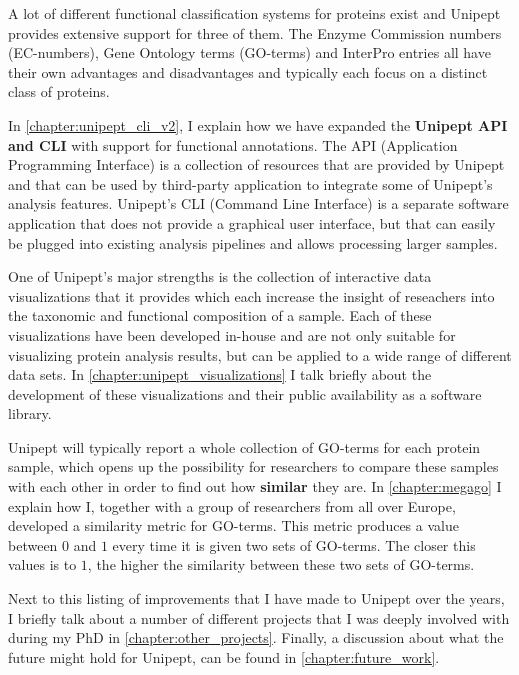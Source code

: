 A lot of different functional classification systems for proteins exist and Unipept provides extensive support for three of them.
The Enzyme Commission numbers (EC-numbers), Gene Ontology terms (GO-terms) and InterPro entries all have their own advantages and disadvantages and typically each focus on a distinct class of proteins.

In \autoref{chapter:unipept_cli_v2}, I explain how we have expanded the \textbf{Unipept API and CLI} with support for functional annotations.
The API (Application Programming Interface) is a collection of resources that are provided by Unipept and that can be used by third-party application to integrate some of Unipept's analysis features.
Unipept's CLI (Command Line Interface) is a separate software application that does not provide a graphical user interface, but that can easily be plugged into existing analysis pipelines and allows processing larger samples.

One of Unipept's major strengths is the collection of interactive data visualizations that it provides which each increase the insight of reseachers into the taxonomic and functional composition of a sample.
Each of these visualizations have been developed in-house and are not only suitable for visualizing protein analysis results, but can be applied to a wide range of different data sets.
In \autoref{chapter:unipept_visualizations} I talk briefly about the development of these visualizations and their public availability as a software library.

Unipept will typically report a whole collection of GO-terms for each protein sample, which opens up the possibility for researchers to compare these samples with each other in order to find out how \textbf{similar} they are.
In \autoref{chapter:megago} I explain how I, together with a group of researchers from all over Europe, developed a similarity metric for GO-terms.
This metric produces a value between $0$ and $1$ every time it is given two sets of GO-terms.
The closer this values is to $1$, the higher the similarity between these two sets of GO-terms.

Next to this listing of improvements that I have made to Unipept over the years, I briefly talk about a number of different projects that I was deeply involved with during my PhD in \autoref{chapter:other_projects}.
Finally, a discussion about what the future might hold for Unipept, can be found in \autoref{chapter:future_work}.
